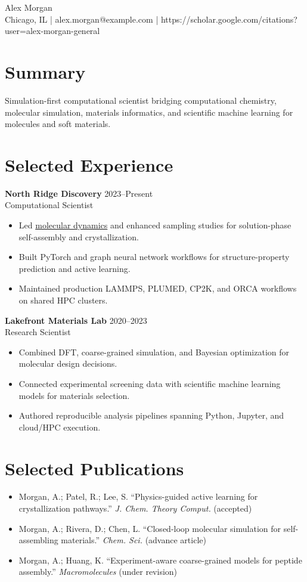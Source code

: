 \documentclass[10pt]{article}
\begin{document}
\begin{center}
  {\LARGE Alex Morgan}\\
  Chicago, IL \quad | \quad alex.morgan@example.com \quad | \quad
  https://scholar.google.com/citations?user=alex-morgan-general
\end{center}

\section*{Summary}
Simulation-first computational scientist bridging computational chemistry, molecular simulation,
materials informatics, and scientific machine learning for molecules and soft materials.

\section*{Selected Experience}
\textbf{North Ridge Discovery} \hfill 2023--Present\\
Computational Scientist
\begin{itemize}
  \item Led \underline{molecular dynamics} and enhanced sampling studies for solution-phase self-assembly and crystallization.
  \item Built PyTorch and graph neural network workflows for structure-property prediction and active learning.
  \item Maintained production LAMMPS, PLUMED, CP2K, and ORCA workflows on shared HPC clusters.
\end{itemize}

\textbf{Lakefront Materials Lab} \hfill 2020--2023\\
Research Scientist
\begin{itemize}
  \item Combined DFT, coarse-grained simulation, and Bayesian optimization for molecular design decisions.
  \item Connected experimental screening data with scientific machine learning models for materials selection.
  \item Authored reproducible analysis pipelines spanning Python, Jupyter, and cloud/HPC execution.
\end{itemize}

\section*{Selected Publications}
\begin{itemize}
  \item Morgan, A.; Patel, R.; Lee, S. ``Physics-guided active learning for crystallization pathways.'' \textit{J. Chem. Theory Comput.} (accepted)
  \item Morgan, A.; Rivera, D.; Chen, L. ``Closed-loop molecular simulation for self-assembling materials.'' \textit{Chem. Sci.} (advance article)
  \item Morgan, A.; Huang, K. ``Experiment-aware coarse-grained models for peptide assembly.'' \textit{Macromolecules} (under revision)
\end{itemize}
\end{document}
